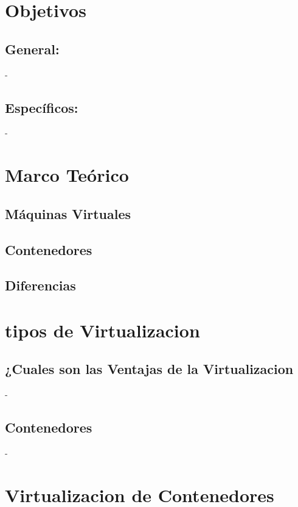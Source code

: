 \documentclass[%
 reprint,
 amsmath,amssymb,
 aps,
]{revtex4-1}
\begin{document}
\section{Objetivos}\label{sec:2}
\subsection{General:}
-  
\subsection{Específicos:}
- 

\section {Marco Teórico}\label{sec:3}


\subsection{Máquinas Virtuales}
\subsection{Contenedores}
\subsection{Diferencias}


\section{tipos de Virtualizacion}\label{sec:4}
\subsection{¿Cuales son las Ventajas de la Virtualizacion}
-  
\subsection{Contenedores}
- 

\section {Virtualizacion de Contenedores}\label{sec:5}
\end{document}
